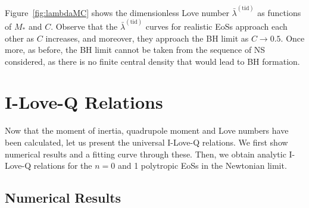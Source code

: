 \documentclass[aps,twocolumn,nofootinbib,showpacs,superscriptaddress,hyperref]{revtex4-1}
\newcommand{\NS}{*}
\newcommand{\tid}{\mathrm{(tid)}}
\begin{document}
Figure~\ref{fig:lambdaMC} shows the dimensionless Love number $\bar{\lambda}^\tid$ as  functions of $M_\NS$ and $C$. Observe that the $\bar{\lambda}^\tid$ curves for realistic EoSs approach each other as $C$ increases, and moreover, they approach the BH limit as $C \to 0.5$. Once more, as before, the BH limit cannot be taken from the sequence of NS considered, as there is no finite central density that would lead to BH formation.

\section{I-Love-Q Relations}
\label{sec:I-Love-Q}

Now that the moment of inertia, quadrupole moment and Love numbers have been calculated, let us present the universal I-Love-Q relations. We first show numerical results and a fitting curve through these. Then, we obtain analytic I-Love-Q relations for the $n=0$ and 1 polytropic EoSs in the Newtonian limit.

\subsection{Numerical Results}
\end{document}
